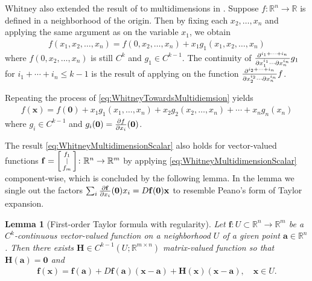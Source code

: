 \documentclass{article}
\theoremstyle{theorem}
\newtheorem{lemma}{Lemma}
\theoremstyle{definition}
\def\RR{\mathbb{R}}
\def\bH{\mathbf{H}}
\def\ba{\mathbf{a}}
\def\bff{\mathbf{f}}
\def\bx{\mathbf{x}}
\def\bzero{\mathbf{0}}
\begin{document}
Whitney also extended the result of  to multidimensions in \cite{Whitney:1943:DRT}.  Suppose \(f\colon\RR^n\to\RR\) is defined in a neighborhood of the origin.  Then by fixing each \(x_2,\ldots,x_n\) and applying the same argument as  on the variable \(x_1\), we obtain
\begin{align}
\label{eq:WhitneyTowardsMultidiemsion}
        f(x_1,x_2,\ldots,x_n) = f(0,x_2,\ldots,x_n) + x_1 g_1(x_1,x_2,\ldots,x_n)
\end{align}
where \(f(0,x_2,\ldots,x_n)\) is still \(C^k\) and \(g_1\in C^{k-1}\).  The continuity of \({\partial^{i_1+\cdots+i_n}\over\partial x_1^{i_1}\cdots \partial x_n^{i_n}}g_1\) for \(i_1+\cdots+i_n\leq{k-1}\) is the result of applying  on the function \({\partial^{i_2+\cdots +i_n}\over\partial x_2^{i_2}\cdots\partial x_n^{i_n}}f\).

Repeating the process of \eqref{eq:WhitneyTowardsMultidiemsion} yields
\begin{align}
\label{eq:WhitneyMultidimensionScalar}
        f(\bx) = f(\bzero) + x_1g_1(x_1,\ldots,x_n) + x_2g_2(x_2,\ldots,x_n)+\cdots+ x_n g_n(x_n)
\end{align}
where \(g_i\in C^{k-1}\) and \(g_i(\bzero) = {\partial f\over\partial x_i}(\bzero)\).

The result \eqref{eq:WhitneyMultidimensionScalar} also holds for vector-valued functions \(\bff = \begin{bsmallmatrix}
    f_1\\|\\f_m
\end{bsmallmatrix}\colon\RR^n\to\RR^m\) by applying \eqref{eq:WhitneyMultidimensionScalar} component-wise, which is concluded by the following lemma.
In the lemma we single out the factors \(\sum_{i}{\partial\bff\over\partial x_i}(\bzero)x_i = D\bff(\bzero)\bx\) to resemble Peano's form of Taylor expansion.

\begin{lemma}[First-order Taylor formula with regularity]
\label{lemma:Taylor}
Let \(\bff\colon U\subset\RR^n\to\RR^m\) be a \(C^k\)-continuous vector-valued function on a neighborhood \(U\) of a given point $\ba\in \RR^n$.
Then there exists \(\bH\in C^{k-1}(U;\RR^{m\times n})\) matrix-valued function so that \(\bH(\ba) = \bzero\) and
\begin{align*}
    \bff(\bx) = \bff(\ba) + D\bff(\ba)(\bx-\ba) + \bH(\bx)(\bx-\ba),\quad\bx\in U.
\end{align*}
\end{lemma}
\end{document}
